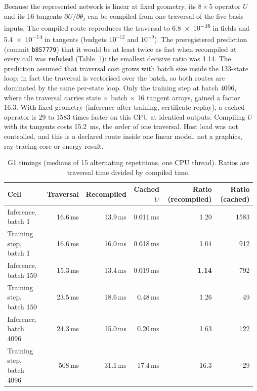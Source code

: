 \documentclass[11pt,a4paper]{article}
\begin{document}
Because the represented network is linear at fixed geometry, its $8\times5$ operator $U$ and its 16 tangents $\partial U/\partial\theta_j$ can be compiled from one traversal of the five basis inputs. The compiled route reproduces the traversal to \num{6.8e-16} in fields and \num{5.4e-14} in tangents (budgets $10^{-12}$ and $10^{-9}$). The preregistered prediction (commit \texttt{b857779}) that it would be at least twice as fast when recompiled at every call was \textbf{refuted} (Table~\ref{tab:g1}): the smallest decisive ratio was 1.14. The prediction assumed that traversal cost grows with batch size inside the 133-state loop; in fact the traversal is vectorised over the batch, so both routes are dominated by the same per-state loop. Only the training step at batch 4096, where the traversal carries state $\times$ batch $\times$ 16 tangent arrays, gained a factor 16.3. With fixed geometry (inference after training, certificate replay), a cached operator is 29 to 1583 times faster on this CPU at identical outputs. Compiling $U$ with its tangents costs \SI{15.2}{ms}, the order of one traversal. Host load was not controlled, and this is a declared route inside one linear model, not a graphics, ray-tracing-core or energy result.

\begin{table}[t]
\centering
\caption{G1 timings (medians of 15 alternating repetitions, one CPU thread). Ratios are traversal time divided by compiled time.}
\label{tab:g1}
\small
\begin{tabular}{@{}lrrrrr@{}}
\toprule
Cell & Traversal & Recompiled & Cached $U$ & Ratio (recompiled) & Ratio (cached) \\
\midrule
Inference, batch 1 & 16.6\,ms & 13.9\,ms & 0.011\,ms & 1.20 & 1583 \\
Training step, batch 1 & 16.6\,ms & 16.0\,ms & 0.018\,ms & 1.04 & 912 \\
Inference, batch 150 & 15.3\,ms & 13.4\,ms & 0.019\,ms & \textbf{1.14} & 792 \\
Training step, batch 150 & 23.5\,ms & 18.6\,ms & 0.48\,ms & 1.26 & 49 \\
Inference, batch 4096 & 24.3\,ms & 15.0\,ms & 0.20\,ms & 1.63 & 122 \\
Training step, batch 4096 & 508\,ms & 31.1\,ms & 17.4\,ms & 16.3 & 29 \\
\bottomrule
\end{tabular}
\end{table}

\end{document}

